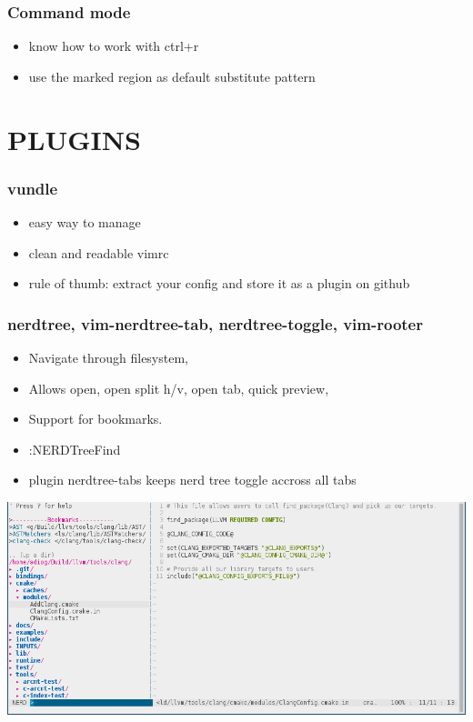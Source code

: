 \documentclass{beamer}
\begin{document}
\begin{frame}
    \frametitle{Command mode}
    \begin{itemize}
        \item know how to work with ctrl+r
        \item use the marked region as default substitute pattern
    \end{itemize}
\end{frame}

\section{PLUGINS}
\begin{frame}
    \frametitle{vundle}
    \begin{itemize}
        \item easy way to manage
        \item clean and readable vimrc
        \item rule of thumb: extract your config and store it as a plugin on github
    \end{itemize}
\end{frame}

\begin{frame}
    \frametitle{nerdtree, vim-nerdtree-tab, nerdtree-toggle, vim-rooter}
    \begin{itemize}
        \item Navigate through filesystem,
        \item Allows open, open split h/v, open tab, quick preview,
        \item Support for bookmarks.
        \item :NERDTreeFind
        \item  plugin nerdtree-tabs keeps nerd tree toggle accross all tabs
    \end{itemize}
 \includegraphics[scale=0.33]{vim_nerdtree_example.png}\\
\end{frame}
\end{document}
